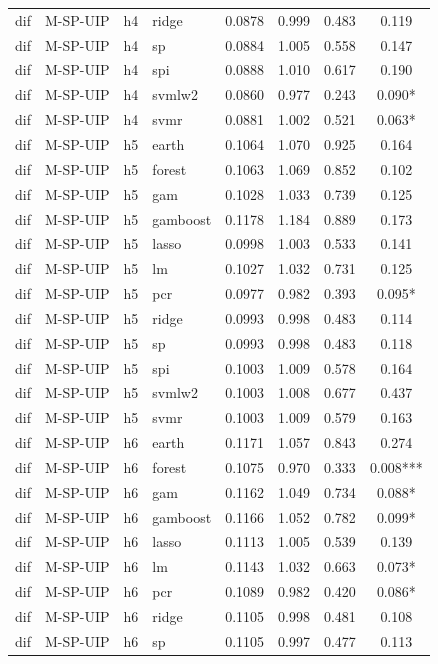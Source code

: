\begin{ThreePartTable}
\begin{longtable}[t]{llclcccc}
dif & M-SP-UIP & h4 & ridge & 0.0878 & 0.999 & 0.483 & 0.119\\
dif & M-SP-UIP & h4 & sp & 0.0884 & 1.005 & 0.558 & 0.147\\
dif & M-SP-UIP & h4 & spi & 0.0888 & 1.010 & 0.617 & 0.190\\
dif & M-SP-UIP & h4 & svmlw2 & 0.0860 & 0.977 & 0.243 & 0.090*\\
dif & M-SP-UIP & h4 & svmr & 0.0881 & 1.002 & 0.521 & 0.063*\\
\addlinespace
dif & M-SP-UIP & h5 & earth & 0.1064 & 1.070 & 0.925 & 0.164\\
dif & M-SP-UIP & h5 & forest & 0.1063 & 1.069 & 0.852 & 0.102\\
dif & M-SP-UIP & h5 & gam & 0.1028 & 1.033 & 0.739 & 0.125\\
dif & M-SP-UIP & h5 & gamboost & 0.1178 & 1.184 & 0.889 & 0.173\\
dif & M-SP-UIP & h5 & lasso & 0.0998 & 1.003 & 0.533 & 0.141\\
dif & M-SP-UIP & h5 & lm & 0.1027 & 1.032 & 0.731 & 0.125\\
dif & M-SP-UIP & h5 & pcr & 0.0977 & 0.982 & 0.393 & 0.095*\\
dif & M-SP-UIP & h5 & ridge & 0.0993 & 0.998 & 0.483 & 0.114\\
dif & M-SP-UIP & h5 & sp & 0.0993 & 0.998 & 0.483 & 0.118\\
dif & M-SP-UIP & h5 & spi & 0.1003 & 1.009 & 0.578 & 0.164\\
dif & M-SP-UIP & h5 & svmlw2 & 0.1003 & 1.008 & 0.677 & 0.437\\
dif & M-SP-UIP & h5 & svmr & 0.1003 & 1.009 & 0.579 & 0.163\\
\addlinespace
dif & M-SP-UIP & h6 & earth & 0.1171 & 1.057 & 0.843 & 0.274\\
dif & M-SP-UIP & h6 & forest & 0.1075 & 0.970 & 0.333 & 0.008***\\
dif & M-SP-UIP & h6 & gam & 0.1162 & 1.049 & 0.734 & 0.088*\\
dif & M-SP-UIP & h6 & gamboost & 0.1166 & 1.052 & 0.782 & 0.099*\\
dif & M-SP-UIP & h6 & lasso & 0.1113 & 1.005 & 0.539 & 0.139\\
dif & M-SP-UIP & h6 & lm & 0.1143 & 1.032 & 0.663 & 0.073*\\
dif & M-SP-UIP & h6 & pcr & 0.1089 & 0.982 & 0.420 & 0.086*\\
dif & M-SP-UIP & h6 & ridge & 0.1105 & 0.998 & 0.481 & 0.108\\
dif & M-SP-UIP & h6 & sp & 0.1105 & 0.997 & 0.477 & 0.113\\

\end{longtable}
\end{ThreePartTable}
